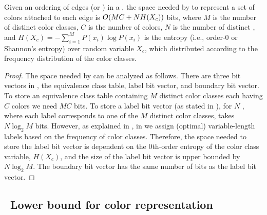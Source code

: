 
\begin{theorem}
Given an ordering of edges (or \kmers) in a \dbg, the space needed by \rainbowfish to
represent a set of colors attached to each edge is $O(MC+N H(X_c))$ bits,
where $M$ is the number of distinct color classes, $C$ is the number of colors,
$N$ is the number of distinct \kmers, and $H(X_c) = -\sum_{i=1}^{M} P(x_i)\log
P(x_i)$ is the entropy (i.e., order-$0$ or Shannon's entropy) over random
variable $X_c$, which distributed according to the frequency distribution of the
color classes.
\label{space-bound} \end{theorem}

\begin{proof}
%
The space needed by \rainbowfish can be analyzed as follows. There are three bit
vectors in \rainbowfish, the equivalence class table, label bit vector, and boundary bit
vector. To store an equivalence class table containing $M$ distinct color
classes each having $C$ colors we need $MC$ bits. To store a label bit vector
(as stated in ), for $N$ \kmers, where each label
corresponds to one of the $M$ distinct color classes, takes $N\log_2{M}$ bits.
However, as explained in , in \rainbowfish we assign (optimal) variable-length
labels based on the frequency of color classes. Therefore, the space needed to
store the label bit vector is dependent on the $0$th-order entropy of the color
class variable, $H(X_c)$, and the size of the label bit vector is upper bounded
by $N\log_2{M}$.  The boundary bit vector has the same number of bits as the
label bit vector. 
%
\end{proof}



\subsection{~Lower bound for color representation}


